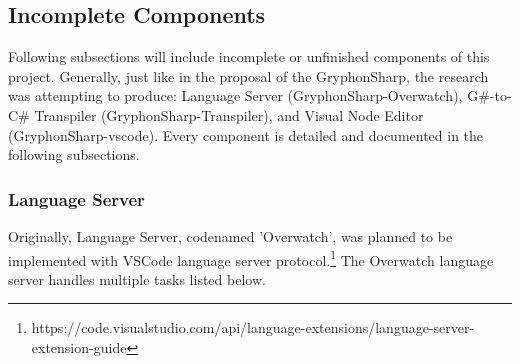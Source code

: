 \documentclass{article}
\begin{document}
\subsection{Incomplete Components}
Following subsections will include incomplete or unfinished components of this project. Generally, just like in the proposal of the GryphonSharp, the research was attempting to produce: Language Server (GryphonSharp-Overwatch), G\#-to-C\# Transpiler (GryphonSharp-Transpiler), and Visual Node Editor (GryphonSharp-vscode).
Every component is detailed and documented in the following subsections.

\subsubsection{Language Server}
Originally, Language Server, codenamed 'Overwatch', was planned to be implemented with VSCode language server protocol.\footnote{https://code.visualstudio.com/api/language-extensions/language-server-extension-guide}
The Overwatch language server handles multiple tasks listed below.
\end{document}
